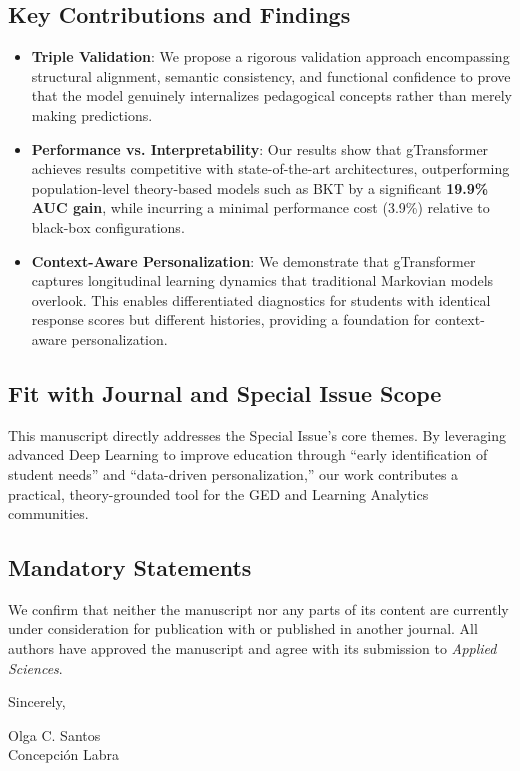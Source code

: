 \documentclass[10pt]{article}
\begin{document}
\subsection*{Key Contributions and Findings}
\begin{itemize}[leftmargin=*, label=$\bullet$, itemsep=0pt, topsep=2pt]
    \item \textbf{Triple Validation}: We propose a rigorous validation approach encompassing structural alignment, semantic consistency, and functional confidence to prove that the model genuinely internalizes pedagogical concepts rather than merely making predictions.
    \item \textbf{Performance vs. Interpretability}: Our results show that gTransformer achieves results competitive with state-of-the-art architectures, outperforming population-level theory-based models such as BKT by a significant \textbf{19.9\% AUC gain}, while incurring a minimal performance cost (3.9\%) relative to black-box configurations.
    \item \textbf{Context-Aware Personalization}: We demonstrate that gTransformer captures longitudinal learning dynamics that traditional Markovian models overlook. This enables differentiated diagnostics for students with identical response scores but different histories, providing a foundation for context-aware personalization.
\end{itemize}

\subsection*{Fit with Journal and Special Issue Scope}
This manuscript directly addresses the Special Issue's core themes. By leveraging advanced Deep Learning to improve education through ``early identification of student needs'' and ``data-driven personalization,'' our work contributes a practical, theory-grounded tool for the GED and Learning Analytics communities.

\subsection*{Mandatory Statements}
We confirm that neither the manuscript nor any parts of its content are currently under consideration for publication with or published in another journal. All authors have approved the manuscript and agree with its submission to \textit{Applied Sciences}.

\vspace{0.4cm}

\noindent
Sincerely,

\vspace{0.4cm}

\noindent
Olga C. Santos \\
Concepción Labra 
\end{document}
